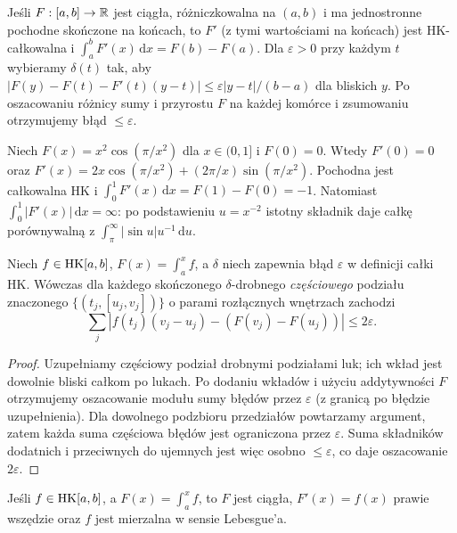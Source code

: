 \begin{przyklad}
Jeśli $F:[a,b]\to\mathbb R$ jest ciągła, różniczkowalna na $(a,b)$ i ma jednostronne pochodne skończone na końcach, to $F'$ (z tymi wartościami na końcach) jest HK-całkowalna i $\int_a^bF'(x)\,\mathrm dx=F(b)-F(a)$. Dla $\varepsilon>0$ przy każdym $t$ wybieramy $\delta(t)$ tak, aby $|F(y)-F(t)-F'(t)(y-t)|\le\varepsilon|y-t|/(b-a)$ dla bliskich $y$. Po oszacowaniu różnicy sumy i przyrostu $F$ na każdej komórce i zsumowaniu otrzymujemy błąd $\le\varepsilon$.
\end{przyklad}
\begin{przyklad}
Niech $F(x)=x^2\cos(\pi/x^2)$ dla $x\in(0,1]$ i $F(0)=0$. Wtedy $F'(0)=0$ oraz $F'(x)=2x\cos(\pi/x^2)+(2\pi/x)\sin(\pi/x^2)$. Pochodna jest całkowalna HK i $\int_0^1F'(x)\,\mathrm dx=F(1)-F(0)=-1$. Natomiast $\int_0^1|F'(x)|\,\mathrm dx=\infty$: po podstawieniu $u=x^{-2}$ istotny składnik daje całkę porównywalną z $\int_\pi^\infty |\sin u|u^{-1}\,\mathrm du$.
\end{przyklad}
\begin{lemat}
Niech $f\in\mathrm{HK}[a,b]$, $F(x)=\int_a^x f$, a $\delta$ niech zapewnia błąd $\varepsilon$ w definicji całki HK. Wówczas dla każdego skończonego $\delta$-drobnego \emph{częściowego} podziału znaczonego $\{(t_j,[u_j,v_j])\}$ o parami rozłącznych wnętrzach zachodzi
\[
\sum_j\left|f(t_j)(v_j-u_j)-(F(v_j)-F(u_j))\right|\le2\varepsilon.
\]
\end{lemat}
\begin{proof}
Uzupełniamy częściowy podział drobnymi podziałami luk; ich wkład jest dowolnie bliski całkom po lukach. Po dodaniu wkładów i użyciu addytywności $F$ otrzymujemy oszacowanie modułu sumy błędów przez $\varepsilon$ (z granicą po błędzie uzupełnienia). Dla dowolnego podzbioru przedziałów powtarzamy argument, zatem każda suma częściowa błędów jest ograniczona przez $\varepsilon$. Suma składników dodatnich i przeciwnych do ujemnych jest więc osobno $\le\varepsilon$, co daje oszacowanie $2\varepsilon$.
\end{proof}
\begin{twierdzenie}
Jeśli $f\in\mathrm{HK}[a,b]$, a $F(x)=\int_a^x f$, to $F$ jest ciągła, $F'(x)=f(x)$ prawie wszędzie oraz $f$ jest mierzalna w sensie Lebesgue'a.
\end{twierdzenie}
